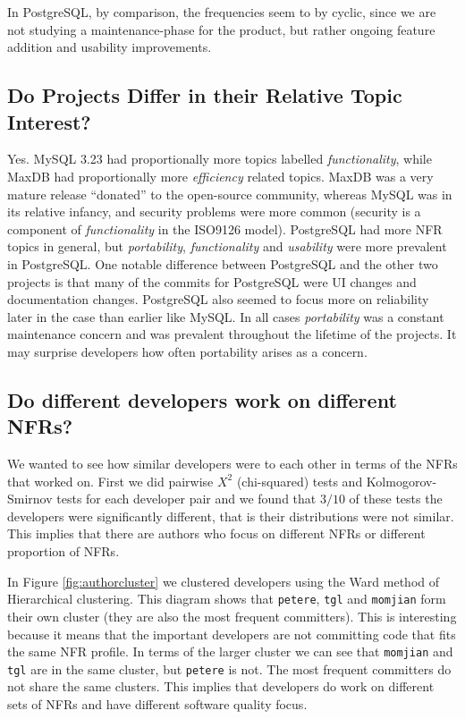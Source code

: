 \documentclass[smallextended]{svjour3}       %
\begin{document}
In PostgreSQL, by comparison, the frequencies seem to by cyclic, since we are not studying a maintenance-phase for the product, but rather ongoing
feature addition and usability improvements.

\subsection{Do Projects Differ in their Relative  Topic Interest?}
Yes. MySQL 3.23 had proportionally more
topics labelled \emph{functionality}, while MaxDB had proportionally more
\emph{efficiency} related topics. MaxDB was a very mature release ``donated'' to the open-source community, 
whereas MySQL was in its relative infancy, and	
security problems were more common (security is a component of \emph{functionality} in the ISO9126 model). 
PostgreSQL had more NFR topics in general, but \emph{portability},
\emph{functionality} and \emph{usability} were more prevalent in
PostgreSQL. One notable difference between PostgreSQL and the other
two projects is that many of the commits for PostgreSQL were UI
changes and documentation changes. PostgreSQL also seemed to focus
more on reliability later in the case than earlier like MySQL.
In all cases \emph{portability} was a constant maintenance concern and was prevalent throughout the lifetime of the projects. It may surprise developers
how often portability arises as a concern.



\subsection{Do different developers work on different NFRs?}


We wanted to see how similar developers were to each other in terms of
the NFRs that worked on. First we did pairwise $X^2$ (chi-squared)
tests and Kolmogorov-Smirnov tests for each developer pair and we
found that $3/10$ of these tests the developers were significantly
different, that is their distributions were not similar. This implies
that there are authors who focus on different NFRs or different
proportion of NFRs.

In Figure \ref{fig:authorcluster} we clustered developers using the
Ward method of Hierarchical clustering.  This diagram shows that
\texttt{petere}, \texttt{tgl} and \texttt{momjian} form their own
cluster (they are also the most frequent committers). This is
interesting because it means that the important developers are not
committing code that fits the same NFR profile. In terms of the larger
cluster we can see that \texttt{momjian} and \texttt{tgl} are in the
same cluster, but \texttt{petere} is not. The most frequent
committers do not share the same clusters. This implies that
developers do work on different sets of NFRs and have different
software quality focus.
\end{document}

